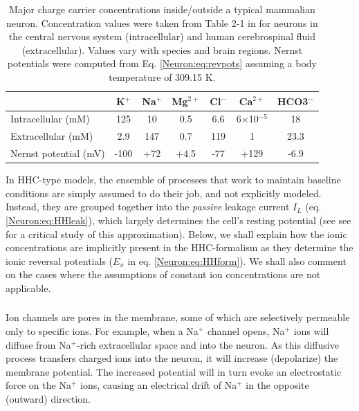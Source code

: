 \begin{table}[h]
\centering
\caption{Major charge carrier concentrations inside/outside a typical mammalian neuron. Concentration values were taken from Table 2-1 in \citep{Somjenboka} for neurons in the central nervous system  (intracellular) and human cerebrospinal fluid (extracellular). Values vary with species and brain regions. Nernst potentials were computed from Eq. \ref{Neuron:eq:revpots} assuming a body temperature of 309.15 K.}
\label{Neuron:tab:ion-concentrations}
\begin{tabular}{lcccccc}\toprule
					& 	K$^+$	&	Na$^+$	&	Mg$^{2+}$	  &	Cl$^-$	&	Ca$^{2+}$	 	& HCO3$^-$ 	\\ \midrule
Intracellular (mM)				    & 125		&		10	&		0.5	&	6.6		&  	6$\times$10$^{-5}$	  & 	18 \\
Extracellular (mM)			           & 2.9			&		147	&		0.7	&	119 		&		1	&	23.3	  	\\
Nernst potential (mV)		    &	-100		&	    	+72	&		+4.5	&	-77		&		+129 	& 	-6.9  	\\
\bottomrule
\end{tabular}{}
\end{table}

\citep{Somjenboka}

In HHC-type models, the ensemble of processes that work to maintain baseline conditions are simply assumed to do their job, and not explicitly modeled. Instead, they are grouped together into the \textit{passive} leakage current $I_L$ (eq. \ref{Neuron:eq:HHleak}), which largely determines the cell's resting potential (see see \cite{offner1991} for a critical study of this approximation). Below, we shall explain how the ionic concentrations are implicitly present in the HHC-formalism as they determine the ionic reversal potentials ($E_x$ in eq. \ref{Neuron:eq:HHform}). We shall also comment on the cases where the assumptions of constant ion concentrations are not applicable. 


\subsubsection{}
\label{sec:Neuron:Erev}
Ion channels are pores in the membrane, some of which are selectively permeable only to specific ions. For example, when a Na$^+$ channel opens, Na$^+$ ions will diffuse from Na$^+$-rich extracellular space and into the neuron. As this diffusive process transfers charged ions into the neuron, it will increase (depolarize) the membrane potential. The increased potential will in turn evoke an electrostatic force on the Na$^+$ ions, causing an electrical drift of Na$^+$ in the opposite (outward) direction. 

